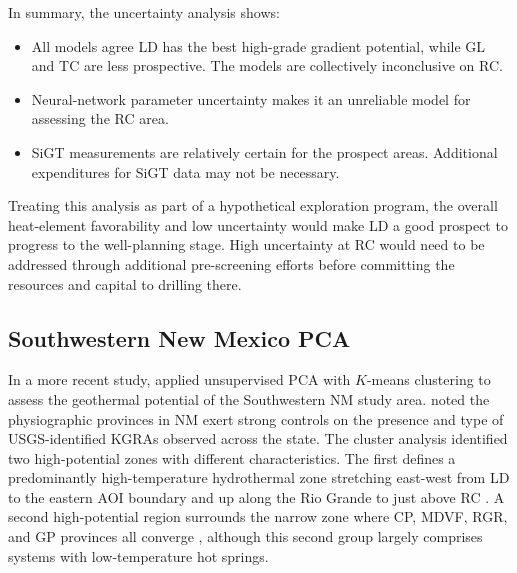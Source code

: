 \noindent
In summary, the uncertainty analysis shows:
\begin{itemize}[itemsep=2pt]
    \item All models agree LD has the best high-grade gradient potential, while GL and TC are less prospective. The models are collectively inconclusive on RC.
    \item Neural-network parameter uncertainty makes it an unreliable model for assessing the RC area.
    \item SiGT measurements are relatively certain for the prospect areas. Additional expenditures for SiGT data may not be necessary.
\end{itemize}
Treating this analysis as part of a hypothetical exploration program, the overall heat-element favorability and low uncertainty would make LD a good prospect to progress to the well-planning stage. High uncertainty at RC would need to be addressed through additional pre-screening efforts before committing the resources and capital to drilling there.

\subsection{Southwestern New Mexico PCA}\label{ch5:case_nm_pca}

In a more recent study, \citet{pepin_new_2019} applied unsupervised PCA with $K$-means clustering to assess the geothermal potential of the Southwestern NM study area. \citeauthor{pepin_new_2019} noted the physiographic provinces in NM exert strong controls on the presence and type of USGS-identified KGRAs observed across the state. The cluster analysis identified two high-potential zones with different characteristics. The first defines a predominantly high-temperature hydrothermal zone stretching east-west from LD to the eastern AOI boundary and up along the Rio Grande to just above RC \citep[][Figure 3.5A]{pepin_new_2019}. A second high-potential region surrounds the narrow zone where CP, MDVF, RGR, and GP provinces all converge \citep[][Figure 3.5C]{pepin_new_2019}, although this second group largely comprises systems with low-temperature hot springs. 

